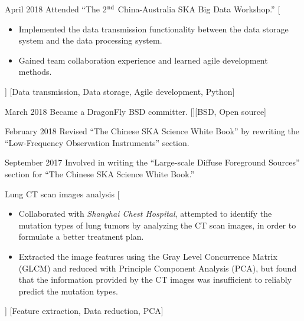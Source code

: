 \documentclass{resume}
\begin{document}
\begin{experiences}
  \experience
    {April 2018}%
    {Attended \enquote{The 2$^{\rm nd}$ China-Australia SKA Big Data Workshop.}}%
    [\begin{itemize}
      \item Implemented the data transmission functionality between the
        data storage system and the
        data processing system.
      \item Gained team collaboration experience and
        learned agile development methods.
    \end{itemize}]%
    [Data transmission, Data storage, Agile development, Python]

  \separator{0.5em}
  \experience
    {March 2018}%
    {Became a DragonFly BSD committer.}%
    [][BSD, Open source]


  \separator{0.5em}
  \experience
    {February 2018}%
    {Revised \enquote{The Chinese SKA Science White Book} by
      rewriting the \enquote{Low-Frequency Observation Instruments} section.}


  \separator{0.5em}
  \experience
    {September 2017}%
    {Involved in writing the
      \enquote{Large-scale Diffuse Foreground Sources} section for
      \enquote{The Chinese SKA Science White Book.}}

  \separator{0.5em}
    {Lung CT scan images analysis}%
    [\begin{itemize}
      \item Collaborated with \textit{Shanghai Chest Hospital},
        attempted to identify the mutation types of lung tumors
        by analyzing the CT scan images, in order to formulate a
        better treatment plan.
      \item Extracted the image features using the Gray Level Concurrence
        Matrix (GLCM) and reduced with Principle Component Analysis (PCA),
        but found that the information provided by the CT images was
        insufficient to reliably predict the mutation types.
    \end{itemize}]%
    [Feature extraction, Data reduction, PCA]


\end{experiences}
\end{document}
